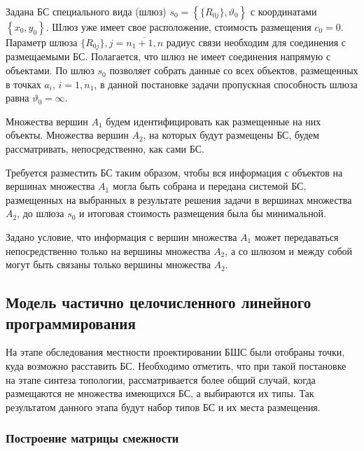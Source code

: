 
Задана БС специального вида (шлюз) $s_0 = \left\{ \{R_{0j}\}, \vartheta_0 \right\}$ с координатами $\left\{x_0, y_0 \right\}$. Шлюз уже имеет свое расположение, стоимость размещения $c_0 = 0$. Параметр шлюза $\{R_{0j}\}, j = \overline{n_1+1,n}$ радиус связи необходим для соединения с размещаемыми БС. Полагается, что шлюз не имеет соединения напрямую с объектами. По шлюз $s_0$ позволяет собрать данные со всех объектов, размещенных в точках $a_i$, $i= \overline{1,n_1}$, в данной постановке задачи пропускная способность шлюза равна $\vartheta_0 = \infty$.


Множества вершин $A_1$ будем идентифицировать как размещенные на них объекты. Множества вершин $A_2$, на которых будут размещены БС, будем рассматривать, непосредственно, как сами БС. 

Требуется разместить БС таким образом, чтобы вся информация с объектов на вершинах множества $A_1$ могла быть собрана и передана системой БС, размещенных на выбранных в результате решения задачи в вершинах множества  $A_2$, до шлюза $s_0$ и итоговая стоимость размещения была бы минимальной.


Задано условие, что информация с вершин множества $A_1$ может передаваться непосредственно только на вершины множества $A_2$, а со шлюзом и между собой могут быть связаны только вершины множества $A_2$.

\subsection{Модель частично целочисленного линейного программирования}

На этапе обследования местности проектировании БШС были отобраны точки, куда возможно расставить БС. Необходимо отметить, что при такой постановке на этапе синтеза топологии, рассматривается более общий случай, когда размещаются не множества имеющихся БС, а выбираются их типы. Так результатом данного этапа будут набор типов БС и их места размещения.

\subsubsection{Построение матрицы смежности}

